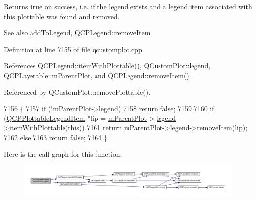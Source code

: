 Returns true on success, i.\+e. if the legend exists and a legend item associated with this plottable was found and removed.

\begin{DoxySeeAlso}{See also}
\hyperlink{class_q_c_p_abstract_plottable_a70f8cabfd808f7d5204b9f18c45c13f5}{add\+To\+Legend}, \hyperlink{class_q_c_p_legend_ac91595c3eaa746fe6321d2eb952c63bb}{Q\+C\+P\+Legend\+::remove\+Item} 
\end{DoxySeeAlso}


Definition at line 7155 of file qcustomplot.\+cpp.



References Q\+C\+P\+Legend\+::item\+With\+Plottable(), Q\+Custom\+Plot\+::legend, Q\+C\+P\+Layerable\+::m\+Parent\+Plot, and Q\+C\+P\+Legend\+::remove\+Item().



Referenced by Q\+Custom\+Plot\+::remove\+Plottable().


\begin{DoxyCode}
7156 \{
7157   \textcolor{keywordflow}{if} (!\hyperlink{class_q_c_p_layerable_aa2a528433e44db02b8aef23c1f9f90ed}{mParentPlot}->\hyperlink{class_q_custom_plot_a4eadcd237dc6a09938b68b16877fa6af}{legend})
7158     \textcolor{keywordflow}{return} \textcolor{keyword}{false};
7159   
7160   \textcolor{keywordflow}{if} (\hyperlink{class_q_c_p_plottable_legend_item}{QCPPlottableLegendItem} *lip = \hyperlink{class_q_c_p_layerable_aa2a528433e44db02b8aef23c1f9f90ed}{mParentPlot}->
      \hyperlink{class_q_custom_plot_a4eadcd237dc6a09938b68b16877fa6af}{legend}->\hyperlink{class_q_c_p_legend_a5ee80cf83f65e3b6dd386942ee3cc1ee}{itemWithPlottable}(\textcolor{keyword}{this}))
7161     \textcolor{keywordflow}{return} \hyperlink{class_q_c_p_layerable_aa2a528433e44db02b8aef23c1f9f90ed}{mParentPlot}->\hyperlink{class_q_custom_plot_a4eadcd237dc6a09938b68b16877fa6af}{legend}->\hyperlink{class_q_c_p_legend_ac91595c3eaa746fe6321d2eb952c63bb}{removeItem}(lip);
7162   \textcolor{keywordflow}{else}
7163     \textcolor{keywordflow}{return} \textcolor{keyword}{false};
7164 \}
\end{DoxyCode}


Here is the call graph for this function\+:\nopagebreak
\begin{figure}[H]
\begin{center}
\leavevmode
\includegraphics[width=350pt]{class_q_c_p_abstract_plottable_aa1f350e510326d012b9a9c9249736c83_cgraph}
\end{center}
\end{figure}




